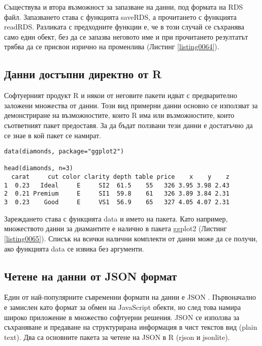 Съществува и втора възможност за запазване на данни, под формата на RDS файл. Запазването става с функцията saveRDS, а прочитането с функцията readRDS. Разликата с предходните функции е, че в този случай се съхранява само един обект, без да се запазва неговото име и при прочитането резултатът трябва да се присвои изрично на променлива (Листинг \ref{listing0064}).

\subsection{Данни достъпни директно от R}

Софтуерният продукт R и някои от неговите пакети идват с предварително заложени множества от данни. Този вид примерни данни основно се използват за демонстриране на възможностите, които R има или възможностите, които съответният пакет предоставя. За да бъдат ползвани тези данни е достатъчно да се знае в кой пакет се намират.

\begin{lstlisting}[caption=Зареждане на примерни данни, label=listing0065]
data(diamonds, package="ggplot2")

head(diamonds, n=3)
  carat     cut color clarity depth table price    x    y    z
1  0.23   Ideal     E     SI2  61.5    55   326 3.95 3.98 2.43
2  0.21 Premium     E     SI1  59.8    61   326 3.89 3.84 2.31
3  0.23    Good     E     VS1  56.9    65   327 4.05 4.07 2.31
\end{lstlisting}

Зареждането става с функцията data и името на пакета. Като например, множеството данни за диамантите е налично в пакета ggplot2 (Листинг \ref{listing0065}). Списък на всички налични комплекти от данни може да се получи, ако функцията data се извика без аргументи.

\subsection{Четене на данни от JSON формат}

Един от най-популярните съвременни формати на данни е JSON \cite{json}. Първоначално е замислен като формат за обмен на JavaScript обекти, но след това намира широко приложение в множество софтуерни решения. JSON се използва за съхраняване и предаване на структурирана информация в чист текстов вид (plain text). Два са основните пакета за четене на JSON в R (rjson и jsonlite).

